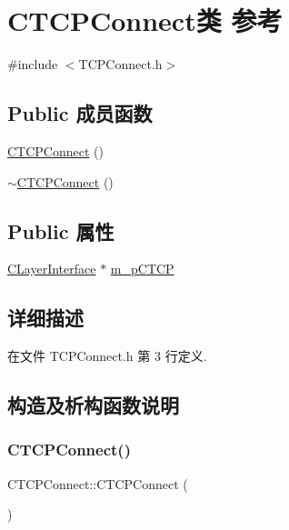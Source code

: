 \hypertarget{class_c_t_c_p_connect}{}\section{C\+T\+C\+P\+Connect类 参考}
\label{class_c_t_c_p_connect}


{\ttfamily \#include $<$T\+C\+P\+Connect.\+h$>$}

\subsection*{Public 成员函数}
\begin{DoxyCompactItemize}
\item 
\hyperlink{class_c_t_c_p_connect_aeb3034135b26b22b54cd3f44691f2744}{C\+T\+C\+P\+Connect} ()
\item 
\hyperlink{class_c_t_c_p_connect_a9f5247e1a88170a943ba0b5c4b07b26c}{$\sim$\+C\+T\+C\+P\+Connect} ()
\end{DoxyCompactItemize}
\subsection*{Public 属性}
\begin{DoxyCompactItemize}
\item 
\hyperlink{class_c_layer_interface}{C\+Layer\+Interface} $\ast$ \hyperlink{class_c_t_c_p_connect_a0418f1607ff29af6941d080cf5896df7}{m\+\_\+p\+C\+T\+CP}
\end{DoxyCompactItemize}


\subsection{详细描述}


在文件 T\+C\+P\+Connect.\+h 第 3 行定义.



\subsection{构造及析构函数说明}
\mbox{\label{class_c_t_c_p_connect_aeb3034135b26b22b54cd3f44691f2744}} 
\subsubsection{\texorpdfstring{C\+T\+C\+P\+Connect()}{CTCPConnect()}}
{\footnotesize\ttfamily C\+T\+C\+P\+Connect\+::\+C\+T\+C\+P\+Connect (\begin{DoxyParamCaption}{ }\end{DoxyParamCaption})}



